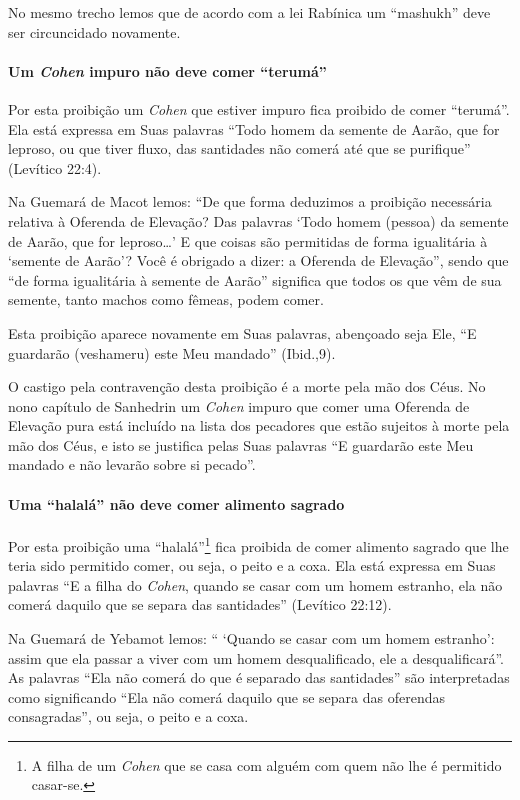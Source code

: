 No mesmo trecho lemos que de acordo com a lei Rabínica um ``mashukh''
deve ser circuncidado novamente.

\paragraph{Um \textit{Cohen} impuro não deve comer ``terumá''}

Por esta proibição um \textit{Cohen} que estiver impuro fica proibido de
comer ``terumá''. Ela está expressa em Suas palavras ``Todo homem da
semente de Aarão, que for leproso, ou que tiver fluxo, das santidades
não comerá até que se purifique'' (Levítico 22:4).

Na Guemará de Macot lemos: ``De que forma deduzimos a proibição
necessária relativa à Oferenda de Elevação? Das palavras `Todo homem
(pessoa) da semente de Aarão, que for leproso\ldots{}' E que coisas são
permitidas de forma igualitária à `semente de Aarão'? Você é obrigado a
dizer: a Oferenda de Elevação'', sendo que ``de forma igualitária à
semente de Aarão'' significa que todos os que vêm de sua semente, tanto
machos como fêmeas, podem comer.

Esta proibição aparece novamente em Suas palavras, abençoado seja Ele,
``E guardarão (veshameru) este Meu mandado'' (Ibid.,9).

O castigo pela contravenção desta proibição é a morte pela mão dos Céus.
No nono capítulo de Sanhedrin um \textit{Cohen} impuro que comer uma Oferenda
de Elevação pura está incluído na lista dos pecadores que estão sujeitos
à morte pela mão dos Céus, e isto se justifica pelas Suas palavras ``E
guardarão este Meu mandado e não levarão sobre si pecado''.

\paragraph{Uma ``halalá'' não deve comer alimento sagrado}

Por esta proibição uma ``halalá''\footnote{A filha de um \textit{Cohen} que se casa com alguém com quem não lhe é
  permitido casar-se.} fica proibida de
comer alimento sagrado que lhe teria sido permitido comer, ou seja, o
peito e a coxa. Ela está expressa em Suas palavras ``E a filha do
\textit{Cohen}, quando se casar com um homem estranho, ela não comerá daquilo
que se separa das santidades'' (Levítico 22:12).

Na Guemará de Yebamot lemos: `` `Quando se casar com um homem estranho':
assim que ela passar a viver com um homem desqualificado, ele a
desqualificará''. As palavras ``Ela não comerá do que é separado das
santidades'' são interpretadas como significando ``Ela não comerá
daquilo que se separa das oferendas consagradas'', ou seja, o peito e a
coxa.

